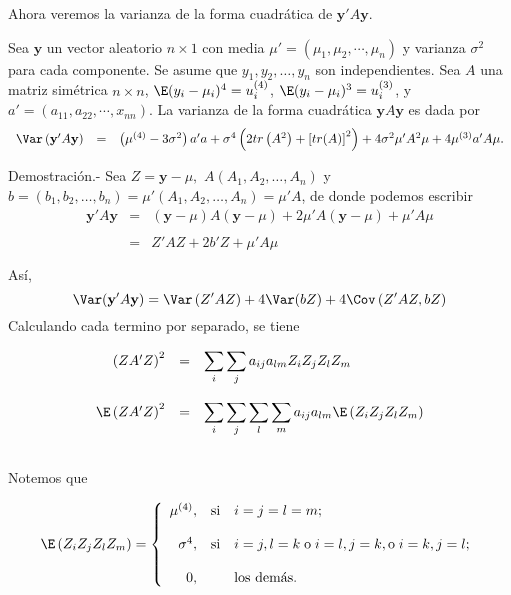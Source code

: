 Ahora veremos la varianza de la forma cuadrática de $\textbf{y}'A\textbf{y}$.

\begin{teo}
    Sea $\textbf{y}$ un vector aleatorio $n\times 1$ con media $\mu'=(\mu_1,\mu_2,\cdots,\mu_n)$ y varianza $\sigma^2$ para cada componente. Se asume que $y_1,y_2,\ldots,y_n$ son independientes. Sea $A$ una matriz simétrica $n\times n$, $\E(y_i-\mu_i)^4=u_i^{(4)}$, $\E(y_i-\mu_i)^3=u_i^{(3)}$, y $a'=(a_{11},a_{22},\cdots,x_{nn})$. La varianza de la forma cuadrática $\textbf{y}A\textbf{y}$ es dada por 
    $$
    \begin{array}{rcl}
	\Var\left(\textbf{y}'A\textbf{y}\right) &=& \left(\mu^{(4)}-3\sigma^2\right)a'a+\sigma^4\left(2tr\left(A^2\right)+\left[tr(A)\right]^2\right) + 4\sigma^2\mu'A^2\mu+4\mu^{(3)}a'A\mu.
    \end{array}
    $$
    \vspace{.3cm}

	Demostración.-\; Sea $Z=\textbf{y}-\mu,$ $A(A_1,A_2,\ldots,A_n)$ y $b=(b_1,b_2,\ldots,b_n)=\mu'(A_1,A_2,\ldots,A_n)=\mu'A$, de donde podemos escribir
    $$
    \begin{array}{rcl}
	\textbf{y}'A\textbf{y} &=& (\textbf{y}-\mu)A(\textbf{y}-\mu)+2\mu'A(\textbf{y}-\mu)+\mu'A\mu\\\\
			       &=& Z'AZ+2b'Z+\mu'A\mu\\\\
    \end{array}
    $$
    Así,
    $$\Var(\textbf{y}'A\textbf{y})=\Var\left(Z'AZ\right)+4\Var(bZ)+4\Cov\left(Z'AZ,bZ\right)$$
    Calculando cada termino por separado, se tiene

    $$
    \begin{array}{rcl}
	\left(ZA'Z\right)^2 &=& \displaystyle\sum_i\sum_j a_{ij}a_{lm} Z_iZ_jZ_lZ_m\\\\
	\E\left(ZA'Z\right)^2 &=& \displaystyle\sum_i\sum_j\sum_l\sum_m a_{ij}a_{lm} \E\left(Z_iZ_jZ_lZ_m\right)\\\\
    \end{array}
    $$

    Notemos que

    $$
    \E\left(Z_iZ_jZ_lZ_m\right) = 
    \left\{
	\begin{array}{rcl}
	    \mu^{(4)}, &\text{si} & i=j=l=m;\\\\
	    \sigma^4, &\text{si} & i=j, l=k\; \mbox{o}\; i=l, j=k, \mbox{o}\; i=k, j=l;\\\\
	    0, & &\mbox{los demás}.
	\end{array}
    \right.
    $$


\end{teo}
